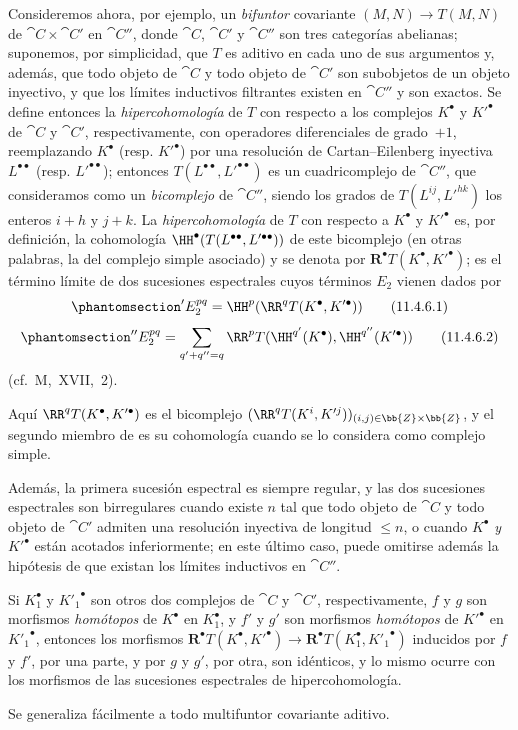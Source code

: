 \documentclass[oneside]{amsart}
\renewcommand{\leq}{\leqslant}
\newcommand{\oldpage}[2][]{{\marginnote{\normalfont\textbf{#1}~|~#2}}\ignorespaces}
\let\EGAOriginalLabel\label
\renewcommand{\label}[1]{\phantomsection\EGAOriginalLabel{#1}}
\begin{document}
\begin{env}[11.4.6]
\label{0.11.4.6}
Consideremos ahora, por ejemplo, un \emph{bifuntor} covariante $(M, N) \rightarrow T(M, N)$ de $\cat{C} \times \cat{C}'$ en $\cat{C}''$, donde $\cat{C}$, $\cat{C}'$ y $\cat{C}''$ son tres categorías abelianas;
suponemos, por simplicidad, que $T$ es aditivo en cada uno de sus argumentos y, además, que todo objeto de $\cat{C}$ y todo objeto de $\cat{C}'$ son subobjetos de un objeto inyectivo,
y que los límites inductivos filtrantes existen en $\cat{C}''$ y son exactos.
Se define entonces la \emph{hipercohomología} de $T$ con respecto a los complejos $K^\bullet$ y $K'^\bullet$ de $\cat{C}$ y $\cat{C}'$, respectivamente, con operadores diferenciales de grado~$+1$, reemplazando $K^\bullet$ (resp. $K'^\bullet$) por una resolución de Cartan--Eilenberg inyectiva $L^{\bullet\bullet}$ (resp. $L'^{\bullet\bullet}$);
entonces $T(L^{\bullet\bullet}, L'^{\bullet\bullet})$ es un cuadricomplejo de $\cat{C}''$, que consideramos como un \emph{bicomplejo} de $\cat{C}''$, siendo los grados de $T(L^{ij}, L'^{hk})$ los enteros $i+h$ y $j+k$.
La \emph{hipercohomología} de $T$ con respecto a $K^\bullet$ y $K'^\bullet$ es, por definición, la cohomología $\HH^\bullet(T(L^{\bullet\bullet}, L'^{\bullet\bullet}))$ de este bicomplejo (en otras palabras, la del complejo simple asociado) y se denota por $\mathbf{R}^\bullet T(K^\bullet, K'^\bullet)$;
\oldpage[0\textsubscript{III}]{35}
es el término límite de dos sucesiones espectrales cuyos términos $E_2$ vienen dados por
\[
\label{0.11.4.6.1}
  'E_2^{pq}
  = \HH^p(\RR^q T(K^\bullet, K'^\bullet))
\tag{11.4.6.1}
\]
\[
\label{0.11.4.6.2}
  ''E_2^{pq}
  = \sum_{q'+q''=q}\RR^p T(\HH^{q'}(K^\bullet),\HH^{q''}(K'^\bullet))
\tag{11.4.6.2}
\]
(cf.~M,~XVII,~2).

Aquí $\RR^q T(K^\bullet, K'^\bullet)$ es el bicomplejo $(\RR^q T(K^i, K'^j))_{(i,j)\in \bb{Z}\times \bb{Z}}$, y el segundo miembro de  es su cohomología cuando se lo considera como complejo simple.

Además, la primera sucesión espectral es siempre regular, y las dos sucesiones espectrales son birregulares cuando existe $n$ tal que todo objeto de $\cat{C}$ y todo objeto de $\cat{C}'$ admiten una resolución inyectiva de longitud $\leq n$, o cuando $K^\bullet$ \emph{y} $K'^\bullet$ están acotados inferiormente;
en este último caso, puede omitirse además la hipótesis de que existan los límites inductivos en $\cat{C}''$.

Si $K_1^\bullet$ y ${K'_1}^\bullet$ son otros dos complejos de $\cat{C}$ y $\cat{C}'$, respectivamente, $f$ y $g$ son morfismos \emph{homótopos} de $K^\bullet$ en $K_1^\bullet$,
y $f'$ y $g'$ son morfismos \emph{homótopos} de $K'^\bullet$ en ${K'_1}^\bullet$, entonces los morfismos $\mathbf{R}^\bullet  T(K^\bullet, K'^\bullet) \rightarrow \mathbf{R}^\bullet  T(K_1^\bullet, {K'_1}^\bullet)$ inducidos por $f$ y $f'$, por una parte, y por $g$ y $g'$, por otra, son idénticos, y lo mismo ocurre con los morfismos de las sucesiones espectrales de hipercohomología.

Se generaliza fácilmente a todo multifuntor covariante aditivo.
\end{env}
\end{document}
